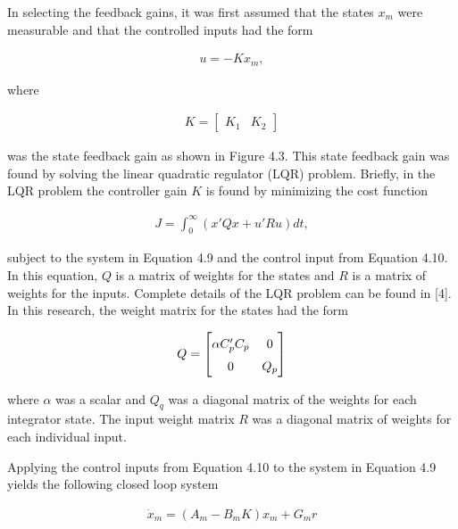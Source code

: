 In selecting the feedback gains, it was first assumed that the states $x_{m}$ were measurable and that the controlled inputs had the form


\begin{align}
	u = -Kx_{m},
\end{align}

\noindent where

\begin{align}
	K = \begin{bmatrix}
		K_{1} & K_{2}
	\end{bmatrix}
\end{align}

was the state feedback gain as shown in Figure 4.3. This state feedback gain was found by solving the linear quadratic regulator (LQR) problem. Briefly, in the LQR problem the controller gain $K$ is found by minimizing the cost function


\begin{align}
	J = \int_{0}^{\infty} \left( x'Qx+u'Ru \right) dt,
\end{align}

subject to the system in Equation 4.9 and the control input from Equation 4.10. In this equation, $Q$ is a matrix of weights for the states and $R$ is a matrix of weights for the inputs. Complete details of the LQR problem can be found in [4]. In this research, the weight
matrix for the states had the form

\begin{align}
	\renewcommand\arraystretch{1.5} Q = \begin{bmatrix}
		\alpha C'_{p}C_{p} & 0 \\ 0 & Q_{p}
	\end{bmatrix}
\end{align}

\noindent where $\alpha$ was a scalar and $Q_{q}$ was a diagonal matrix of the weights for each integrator state. The input weight matrix $R$ was a diagonal matrix of weights for each individual input.

Applying the control inputs from Equation 4.10 to the system in Equation 4.9 yields the following closed loop system


\begin{align*}
	\dot x_{m} = \left( A_{m} - B_{m}K \right) x_{m} + G_{m} r
\end{align*}


